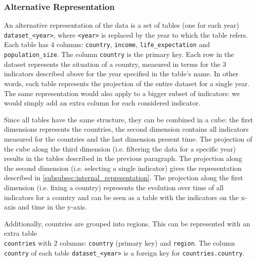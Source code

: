 \subsubsection{Alternative Representation}
An alternative representation of the data is a set of tables (one for each year) \texttt{dataset\_<year>}, where \texttt{<year>} is replaced by the year to which the table refers.
Each table has $4$ columns: \texttt{country}, \texttt{income}, \texttt{life\_expectation} and \texttt{population\_size}.
The column \texttt{country} is the primary key.
Each row in the dataset represents the situation of a country, measured in terms for the $3$ indicators described above for the year specified in the table's name.
In other words, each table represents the projection of the entire dataset for a single year.
The same representation would also apply to a bigger subset of indicators: we would simply add an extra column for each considered indicator.

Since all tables have the same structure, they can be combined in a cube:
the first dimensions represents the countries, the second dimension contains all indicators measured for the countries and the last dimension present time.
The projection of the cube along the third dimension (i.e. filtering the data for a specific year) results in the tables described in the previous paragraph.
The projection along the second dimension (i.e. selecting a single indicator) gives the representation described in \cref{subsubsec:internal_representation}. 
The projection along the first dimension (i.e. fixing a country) represents the evolution over time of all indicators for a country and can be seen as a table with the indicators on the x-axis and time in the y-axis.

Additionally, countries are grouped into regions.
This can be represented with an extra table \\ \texttt{countries} with $2$ columns: \texttt{country} (primary key) and \texttt{region}.
The column \texttt{country} of each table \texttt{dataset\_<year>} is a foreign key for \texttt{countries.country}.
